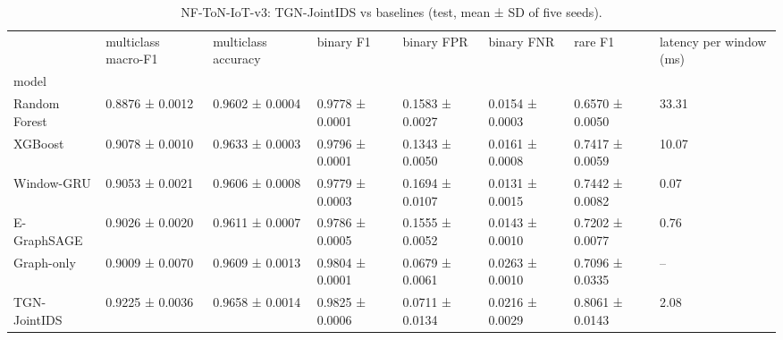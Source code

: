 \begin{table}
\caption{NF-ToN-IoT-v3: TGN-JointIDS vs baselines (test, mean ± SD of five seeds).}
\label{tab:baselines_nf_ton_iot_v3}
\begin{tabular}{llllllll}
\toprule
 & multiclass macro-F1 & multiclass accuracy & binary F1 & binary FPR & binary FNR & rare F1 & latency per window (ms) \\
model &  &  &  &  &  &  &  \\
\midrule
Random Forest & 0.8876 ± 0.0012 & 0.9602 ± 0.0004 & 0.9778 ± 0.0001 & 0.1583 ± 0.0027 & 0.0154 ± 0.0003 & 0.6570 ± 0.0050 & 33.31 \\
XGBoost & 0.9078 ± 0.0010 & 0.9633 ± 0.0003 & 0.9796 ± 0.0001 & 0.1343 ± 0.0050 & 0.0161 ± 0.0008 & 0.7417 ± 0.0059 & 10.07 \\
Window-GRU & 0.9053 ± 0.0021 & 0.9606 ± 0.0008 & 0.9779 ± 0.0003 & 0.1694 ± 0.0107 & 0.0131 ± 0.0015 & 0.7442 ± 0.0082 & 0.07 \\
E-GraphSAGE & 0.9026 ± 0.0020 & 0.9611 ± 0.0007 & 0.9786 ± 0.0005 & 0.1555 ± 0.0052 & 0.0143 ± 0.0010 & 0.7202 ± 0.0077 & 0.76 \\
Graph-only & 0.9009 ± 0.0070 & 0.9609 ± 0.0013 & 0.9804 ± 0.0001 & 0.0679 ± 0.0061 & 0.0263 ± 0.0010 & 0.7096 ± 0.0335 & – \\
TGN-JointIDS & 0.9225 ± 0.0036 & 0.9658 ± 0.0014 & 0.9825 ± 0.0006 & 0.0711 ± 0.0134 & 0.0216 ± 0.0029 & 0.8061 ± 0.0143 & 2.08 \\
\bottomrule
\end{tabular}
\end{table}
